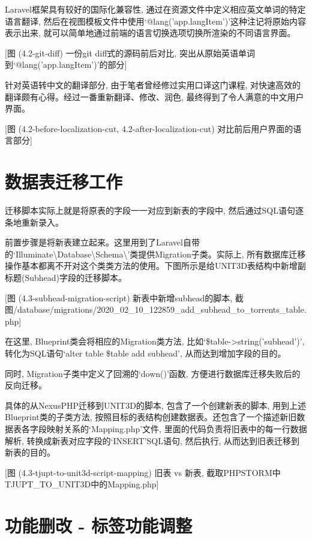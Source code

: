 Laravel框架具有较好的国际化兼容性, 通过在资源文件中定义相应英文单词的特定语言翻译, 然后在视图模板文件中使用`@lang('app.langItem')'这种注记将原始内容表示出来, 就可以简单地通过前端的语言切换选项切换所渲染的不同语言界面。

[图 (4.2-git-diff) 一份git diff式的源码前后对比, 突出从原始英语单词到`@lang('app.langItem')'的部分]

针对英语转中文的翻译部分, 由于笔者曾经修过实用口译这门课程, 对快速高效的翻译颇有心得。经过一番重新翻译、修改、润色, 最终得到了令人满意的中文用户界面。

[图 (4.2-before-localization-cut, 4.2-after-localization-cut) 对比前后用户界面的语言部分]


\section{数据表迁移工作}

迁移脚本实际上就是将原表的字段一一对应到新表的字段中, 然后通过SQL语句逐条地重新录入。

前置步骤是将新表建立起来。这里用到了Laravel自带的`Illuminate\textbackslash Database\textbackslash Schema\textbackslash'类提供Migration子类。实际上, 所有数据库迁移操作基本都离不开对这个类类方法的使用。下图所示是给UNIT3D表结构中新增副标题(Subhead)字段的迁移脚本。

[图 (4.3-subhead-migration-script) 新表中新增subhead的脚本, 截图/database/migrations/2020\_02\_10\_122859\_add\_subhead\_to\_torrents\_table.php]

在这里, Blueprint类会将相应的Migration类方法, 比如`\$table->string('subhead')', 转化为SQL语句`alter table \$table add subhead', 从而达到增加字段的目的。

同时, Migration子类中定义了回溯的`down()'函数, 方便进行数据库迁移失败后的反向迁移。

具体的从NexusPHP迁移到UNIT3D的脚本, 包含了一个创建新表的脚本, 用到上述Blueprint类的子类方法, 按照目标的表结构创建数据表。还包含了一个描述新旧数据表各字段映射关系的`Mapping.php'文件, 里面的代码负责将旧表中的每一行数据解析, 转换成新表对应字段的`INSERT'SQL语句, 然后执行, 从而达到旧表迁移到新表的目的。

[图 (4.3-tjupt-to-unit3d-script-mapping) 旧表 vs 新表, 截取PHPSTORM中TJUPT\_TO\_UNIT3D中的Mapping.php]


\section{功能删改 - 标签功能调整}

